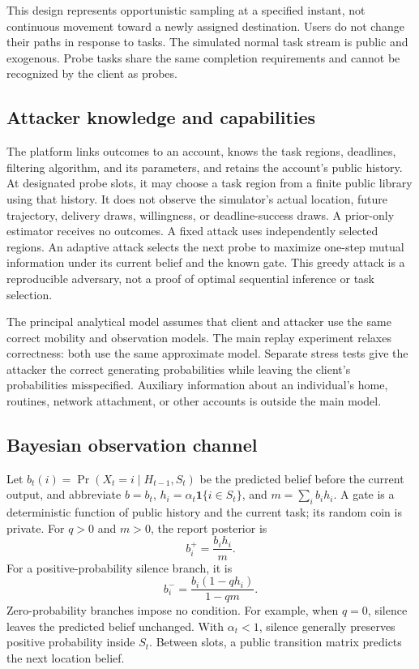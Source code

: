 \documentclass[review,11pt,times]{elsarticle}
\newcommand{\ind}{\mathbf{1}}
\begin{document}
This design represents opportunistic sampling at a specified instant, not continuous movement toward a newly assigned destination. Users do not change their paths in response to tasks. The simulated normal task stream is public and exogenous. Probe tasks share the same completion requirements and cannot be recognized by the client as probes.

\subsection{Attacker knowledge and capabilities}
The platform links outcomes to an account, knows the task regions, deadlines, filtering algorithm, and its parameters, and retains the account's public history. At designated probe slots, it may choose a task region from a finite public library using that history. It does not observe the simulator's actual location, future trajectory, delivery draws, willingness, or deadline-success draws. A prior-only estimator receives no outcomes. A fixed attack uses independently selected regions. An adaptive attack selects the next probe to maximize one-step mutual information under its current belief and the known gate. This greedy attack is a reproducible adversary, not a proof of optimal sequential inference or task selection.

The principal analytical model assumes that client and attacker use the same correct mobility and observation models. The main replay experiment relaxes correctness: both use the same approximate model. Separate stress tests give the attacker the correct generating probabilities while leaving the client's probabilities misspecified. Auxiliary information about an individual's home, routines, network attachment, or other accounts is outside the main model.

\subsection{Bayesian observation channel}
Let $b_t(i)=\Pr(X_t=i\mid H_{t-1},S_t)$ be the predicted belief before the current output, and abbreviate $b=b_t$, $h_i=\alpha_t\ind\{i\in S_t\}$, and $m=\sum_i b_i h_i$. A gate is a deterministic function of public history and the current task; its random coin is private. For $q>0$ and $m>0$, the report posterior is
\begin{equation}
 b_i^+=\frac{b_i h_i}{m}.
 \label{eq:positive}
\end{equation}
For a positive-probability silence branch, it is
\begin{equation}
 b_i^-=\frac{b_i(1-qh_i)}{1-qm}.
 \label{eq:silence}
\end{equation}
Zero-probability branches impose no condition. For example, when $q=0$, silence leaves the predicted belief unchanged. With $\alpha_t<1$, silence generally preserves positive probability inside $S_t$. Between slots, a public transition matrix predicts the next location belief.
\end{document}
